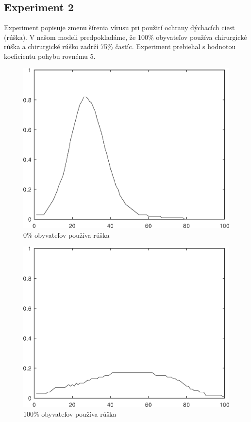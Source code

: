 \documentclass[11pt,a4paper,titlepage]{article}
\begin{document}
\newpage
\subsection{Experiment 2}
Experiment popisuje zmenu šírenia vírusu pri použití ochrany dýchacích ciest (rúška). V našom modeli predpokladáme, že 100\% obyvateľov používa chirurgické rúška a chirurgické rúško zadrží 75\% častíc.\cite{Masks}
Experiment prebiehal s hodnotou koeficientu pohybu rovnému 5.

\begin{figure}[h!]
    \center
    \includegraphics[width=.39\linewidth]{movement5transmission0,059.eps}
    \caption{0\% obyvateľov používa rúška}
\end{figure}

\begin{figure}[h!]
    \centering
    \includegraphics[width=.39\linewidth]{movement5transmission0,01475.eps}
    \caption{100\% obyvateľov používa rúška}
\end{figure}


\newpage
\renewcommand{\refname}{Referencie}

\end{document}

